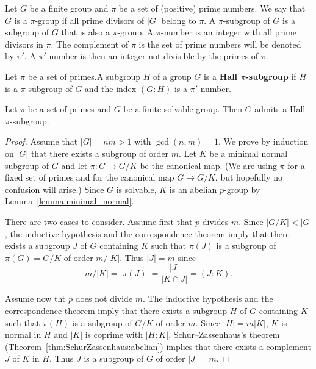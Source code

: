 Let $G$ be a finite group and $\pi$ be a set of (positive) prime numbers. We say that
$G$ is a $\pi$-group if all prime divisors of $|G|$ belong to $\pi$.
A $\pi$-subgroup of $G$ is a subgroup of $G$ that is also a $\pi$-group. 
A $\pi$-number is an integer with all prime divisors in 
$\pi$. The complement of $\pi$ is the set of prime numbers will be denoted by 
$\pi'$. A $\pi'$-number is then an integer not divisible by the primes 
of $\pi$.

\medskip
{}
Let $\pi$ be a set of primes.A subgroup $H$ of a group $G$ is a 
\textbf{Hall $\pi$-subgroup} if $H$ is a $\pi$-subgroup of $G$ and the index $(G:H)$
is a $\pi'$-number.

\begin{theorem}[Hall]
	\label{thm:HallE}
	Let $\pi$ be a set of primes and $G$ be a finite solvable group. Then 
	$G$ admits a Hall $\pi$-subgroup. 
\end{theorem}

\begin{proof}
	Assume that $|G|=nm>1$ with $\gcd(n,m)=1$. We prove by induction on  
	$|G|$ that there exists a subgroup of order $m$. Let $K$ 
	be a minimal normal subgroup of $G$ 
	and let $\pi\colon G\to G/K$ be the canonical map. (We are using $\pi$ for a fixed set
	of primes and for the canonical map $G\to G/K$, but hopefully no confusion will arise.) 
	Since $G$ is solvable, $K$ is an abelian $p$-group by Lemma~\ref{lemma:minimal_normal}.
	
	There are two cases to consider. Assume first that $p$ divides $m$. Since 
	$|G/K|<|G|$, the inductive hypothesis and the correspondence theorem imply that there exists 
	a subgroup $J$ of $G$ containing $K$ such that $\pi(J)$ is a subgroup of 
	$\pi(G)=G/K$ of order $m/|K|$. Thus $|J|=m$ since  
	\[
	m/|K|=|\pi(J)|=\frac{|J|}{|K\cap J|}=(J:K).
	\]

	Assume now tht $p$ does not divide $m$. The inductive hypothesis and the correspondence theorem 
	imply that there exists a subgroup $H$ of $G$ containing $K$ such that 
	$\pi(H)$ is a subgroup of $G/K$ of order $m$.  Since $|H|=m|K|$, $K$ 
	is normal in $H$ and $|K|$ is coprime with $|H:K|$, 
	Schur--Zassenhaus's theorem (Theorem~\ref{thm:SchurZassenhaus:abelian}) implies 
	that there exists a complement 
	$J$ of $K$ in $H$. Thus $J$ is a subgroup of $G$ of order 
	$|J|=m$.
\end{proof}

